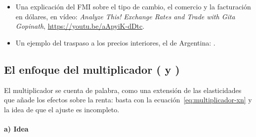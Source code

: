 \documentclass[11pt]{article}
\begin{document}
\begin{anotaciones}
\begin{itemize}
\item Una explicación del FMI sobre el tipo de cambio, el comercio y la facturación en dólares, en vídeo: \emph{Analyze This! Exchange Rates and Trade with Gita Gopinath}, \url{https://youtu.be/aApyiK-dDtc}\nocite{FMIAnalyzeThisGopinath}.
\item Un ejemplo del traspaso a los precios interiores, el de Argentina: \textcite{Alvarez2022PassThrough}.
\end{itemize}
\end{anotaciones}

\subsection{El enfoque del multiplicador ( y )}\label{sec:multiplicador}

\begin{notaopositor}
El multiplicador se cuenta de palabra, como una extensión de las elasticidades que añade los efectos sobre la renta: basta con la ecuación~\eqref{eq:multiplicador-xn} y la idea de que el ajuste es incompleto.
\end{notaopositor}

\paragraph{a) Idea}
\end{document}
